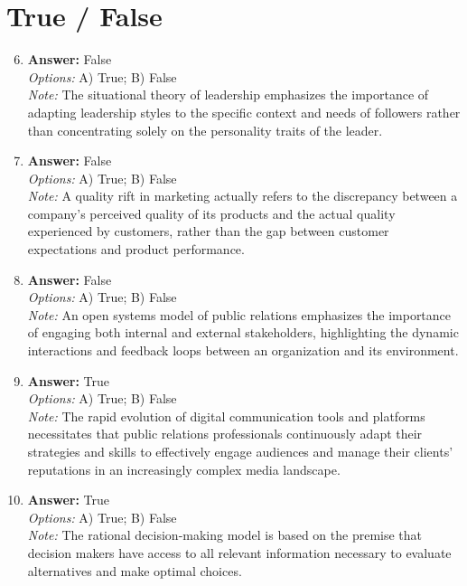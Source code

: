 \documentclass[12pt]{article}
\begin{document}
\section*{True / False}
\begin{enumerate}[label=\arabic*.]
\setcounter{enumi}{5}
\item \textbf{Answer:} False
\\ \textit{Options:} A) True; B) False
\\ \textit{Note:} The situational theory of leadership emphasizes the importance of adapting leadership styles to the specific context and needs of followers rather than concentrating solely on the personality traits of the leader.
\item \textbf{Answer:} False
\\ \textit{Options:} A) True; B) False
\\ \textit{Note:} A quality rift in marketing actually refers to the discrepancy between a company's perceived quality of its products and the actual quality experienced by customers, rather than the gap between customer expectations and product performance.
\item \textbf{Answer:} False
\\ \textit{Options:} A) True; B) False
\\ \textit{Note:} An open systems model of public relations emphasizes the importance of engaging both internal and external stakeholders, highlighting the dynamic interactions and feedback loops between an organization and its environment.
\item \textbf{Answer:} True
\\ \textit{Options:} A) True; B) False
\\ \textit{Note:} The rapid evolution of digital communication tools and platforms necessitates that public relations professionals continuously adapt their strategies and skills to effectively engage audiences and manage their clients' reputations in an increasingly complex media landscape.
\item \textbf{Answer:} True
\\ \textit{Options:} A) True; B) False
\\ \textit{Note:} The rational decision-making model is based on the premise that decision makers have access to all relevant information necessary to evaluate alternatives and make optimal choices.
\end{enumerate}
\end{document}
